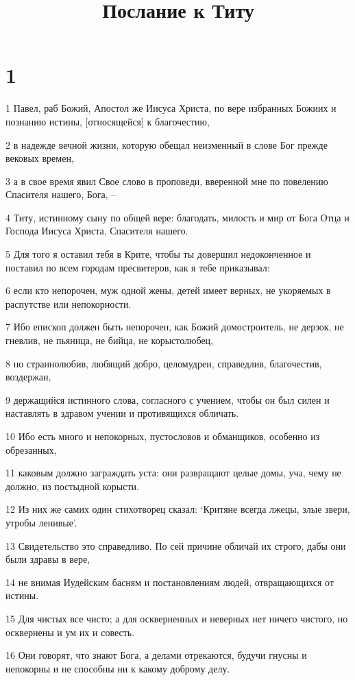 

\title{Послание к Титу}


\chapter{1}

\par 1 Павел, раб Божий, Апостол же Иисуса Христа, по вере избранных Божиих и познанию истины, [относящейся] к благочестию,
\par 2 в надежде вечной жизни, которую обещал неизменный в слове Бог прежде вековых времен,
\par 3 а в свое время явил Свое слово в проповеди, вверенной мне по повелению Спасителя нашего, Бога, --
\par 4 Титу, истинному сыну по общей вере: благодать, милость и мир от Бога Отца и Господа Иисуса Христа, Спасителя нашего.
\par 5 Для того я оставил тебя в Крите, чтобы ты довершил недоконченное и поставил по всем городам пресвитеров, как я тебе приказывал:
\par 6 если кто непорочен, муж одной жены, детей имеет верных, не укоряемых в распутстве или непокорности.
\par 7 Ибо епископ должен быть непорочен, как Божий домостроитель, не дерзок, не гневлив, не пьяница, не бийца, не корыстолюбец,
\par 8 но страннолюбив, любящий добро, целомудрен, справедлив, благочестив, воздержан,
\par 9 держащийся истинного слова, согласного с учением, чтобы он был силен и наставлять в здравом учении и противящихся обличать.
\par 10 Ибо есть много и непокорных, пустословов и обманщиков, особенно из обрезанных,
\par 11 каковым должно заграждать уста: они развращают целые домы, уча, чему не должно, из постыдной корысти.
\par 12 Из них же самих один стихотворец сказал: `Критяне всегда лжецы, злые звери, утробы ленивые'.
\par 13 Свидетельство это справедливо. По сей причине обличай их строго, дабы они были здравы в вере,
\par 14 не внимая Иудейским басням и постановлениям людей, отвращающихся от истины.
\par 15 Для чистых все чисто; а для оскверненных и неверных нет ничего чистого, но осквернены и ум их и совесть.
\par 16 Они говорят, что знают Бога, а делами отрекаются, будучи гнусны и непокорны и не способны ни к какому доброму делу.

